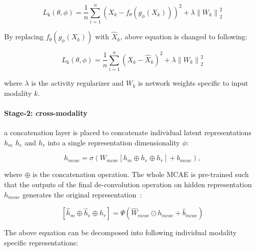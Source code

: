 \begin{equation}
    L_{\mathrm{k}}(\theta, \phi)=\frac{1}{n} \sum_{i=1}^{n}\left({X_k}-f_{\theta}\left(g_{\phi}\left({X_k}\right)\right)\right)^{2} +\lambda\left\|W_{k}\right\|_{2}^{2}
\end{equation} 

\hspace*{3.5mm} By replacing $f_{\theta}\left(g_{\phi}\left({X_k}\right)\right)$ with $\hat{X}_{k}$, above equation is changed to following: 

\begin{equation}
    L_{\mathrm{k}}(\theta, \phi)=\frac{1}{n} \sum_{i=1}^{n}\left({X_k}-\hat{X}_{k}\right)^{2} +\lambda\left\|W_{k}\right\|_{2}^{2}
\end{equation} 

\hspace*{3.5mm} where $\lambda$ is the activity regularizer and $W_{k}$ is network weights specific to input modality $k$. 

\paragraph{Stage-2: cross-modality}\hspace{-3mm} 
a concatenation layer is placed to concatenate individual latent representations $h_{m}$ $h_{e}$ and $h_{r}$ into a single representation dimensionality $\phi$:  

\begin{equation}
    h_{mcae}=\sigma\left(W_{mcae}\left[h_{m} \oplus h_{e} \oplus h_{r}\right]+b_{mcae}\right),
\end{equation}

\hspace*{3.5mm} where $\oplus$ is the concatenation operation. The whole MCAE is pre-trained such that the outputs of the final de-convolution operation on hidden representation $h_{mcae}$ generates the original representation~\cite{wang2018associativemulti}: 

\begin{equation}
    \left[\hat{h}_{m}\oplus \hat{h}_{e} \oplus \hat{h}_{r}
    \right]=\Psi\left(\hat W_{mcae} \odot h_{mcae}+\hat {b}_{mcae}\right)
\end{equation}

\hspace*{3.5mm} The above equation can be decomposed into following individual modality specific representations:  

